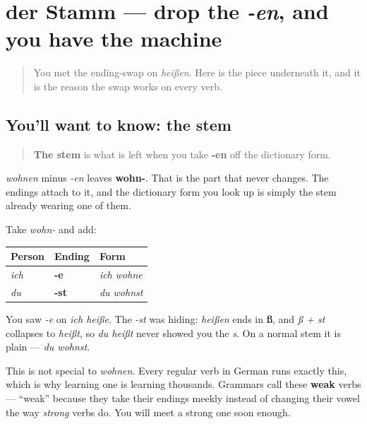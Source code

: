 \section[der Stamm]{der Stamm — drop the \emph{-en}, and you have the machine}

\label{lesson:GE-C05-verbstamm}



\begin{quote}
You met the ending-swap on \emph{heißen}. Here is the piece underneath it, and it is the reason the swap works on every verb.
\end{quote}

\subsection*{You'll want to know: the stem}
\begin{quote}
\textbf{The stem} is what is left when you take \textbf{-en} off the dictionary form.
\end{quote}

\emph{wohnen} minus \emph{-en} leaves \textbf{wohn-}. That is the part that never changes. The endings attach to it, and the dictionary form you look up is simply the stem already wearing one of them.

\begin{grammarlens}[title={Grammar Lens: the three singular endings}]
Take \emph{wohn-} and add:

\noindent
\begin{tabularx}{\linewidth}{@{}>{\raggedright\arraybackslash}X>{\raggedright\arraybackslash}X>{\raggedright\arraybackslash}X@{}}
\toprule
\textbf{Person} & \textbf{Ending} & \textbf{Form} \\
\midrule
\emph{ich} & \textbf{-e} & \emph{ich wohne} \\
\emph{du} & \textbf{-st} & \emph{du wohnst} \\
\bottomrule
\end{tabularx}

You saw \emph{-e} on \emph{ich heiße}. The \emph{-st} was hiding: \emph{heißen} ends in \textbf{ß}, and \emph{ß + st} collapses to \emph{heißt}, so \emph{du heißt} never showed you the \emph{s}. On a normal stem it is plain — \emph{du wohnst}.

This is not special to \emph{wohnen}. Every regular verb in German runs exactly this, which is why learning one is learning thousands. Grammars call these \textbf{weak} verbs — \textquotedblleft{}weak\textquotedblright{} because they take their endings meekly instead of changing their vowel the way \emph{strong} verbs do. You will meet a strong one soon enough.
\end{grammarlens}

